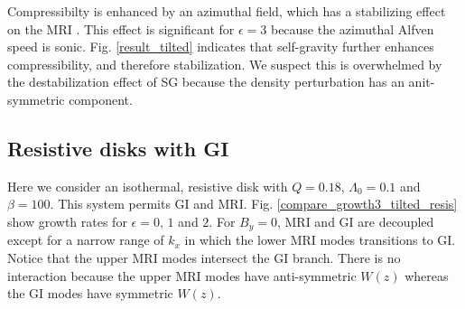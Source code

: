 Compressibilty is enhanced by an azimuthal field, which has a
stabilizing effect on the MRI \citep{kim00}. %
This effect is significant for $\epsilon=3$ because the azimuthal
Alfven speed is sonic.    
Fig. \ref{result_tilted} indicates that self-gravity further enhances
compressibility, and therefore stabilization. We suspect this is
overwhelmed by the destabilization effect of SG because the density
perturbation has an anit-symmetric component.     







\subsection{Resistive disks with GI}
Here we consider an isothermal, resistive disk with $Q=0.18$,
$\Lambda_0=0.1$ and $\beta=100$. This system permits GI and MRI. 
Fig. \ref{compare_growth3_tilted_resis} show growth rates for
$\epsilon=0,\,1$ and $2$. For $B_y=0$, MRI and GI are decoupled except 
for a narrow range of $k_x$ in which the lower MRI modes transitions to
GI. Notice that the upper MRI modes intersect the GI branch. There is no
interaction because the upper MRI modes have anti-symmetric $W(z)$ whereas
the GI modes have symmetric $W(z)$. 



